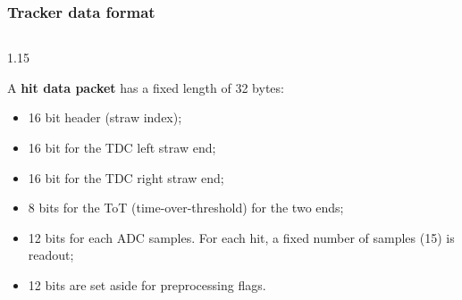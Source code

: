 \documentclass{beamer}
\begin{document}
\begin{frame}
    \frametitle{Tracker data format}
    \begin{columns}
        \begin{column}{1.15\framewidth}
    \setlength{\leftmargini}{1.em}

    A \textbf{hit data packet} has
    a fixed length of 32 bytes:
    \vspace{2mm}
    \begin{itemize}
        \item 16 bit header (straw index);
        \vspace{1mm}
        \item 16 bit for the TDC left straw end;
        \vspace{1mm}
        \item 16 bit for the TDC right straw end;
        \vspace{1mm}
        \item 8 bits for the ToT (time-over-threshold) for the two ends;
        \vspace{1mm}
        \item 12 bits for each ADC samples. For each hit, a fixed number of 
        samples (15) is readout;
        \vspace{1mm}
        \item 12 bits are set aside for preprocessing flags.
    \end{itemize}
\end{column}
\end{columns}
    \end{frame}
\end{document}
